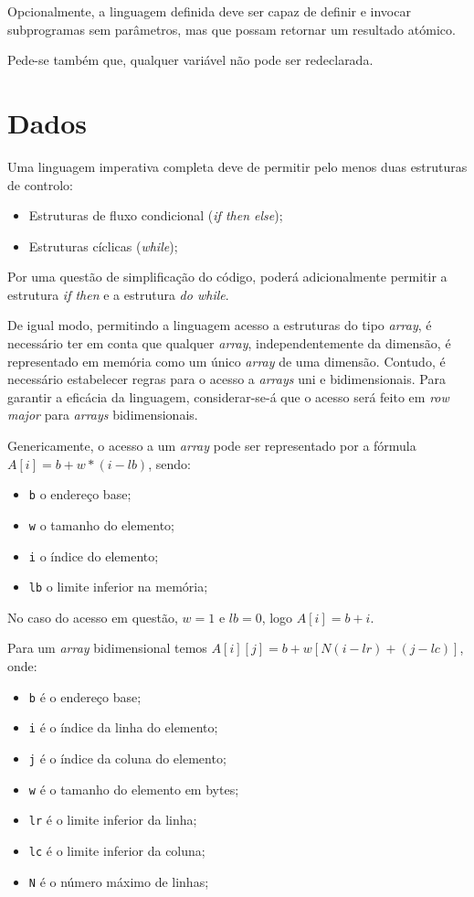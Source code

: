 Opcionalmente, a linguagem definida deve ser capaz de definir e invocar
subprogramas sem parâmetros, mas que possam retornar um resultado atómico.

Pede-se também que, qualquer variável não pode ser redeclarada.

\section{Dados}
\label{sec:dados:analise}

Uma linguagem imperativa completa deve de permitir pelo menos duas estruturas de controlo:

\begin{itemize}
	\item Estruturas de fluxo condicional (\emph{if then else});
	\item Estruturas cíclicas (\emph{while});
\end{itemize}

Por uma questão de simplificação do código, poderá adicionalmente permitir
a estrutura \emph{if then} e a estrutura \emph{do while}.

De igual modo, permitindo a linguagem acesso a estruturas do tipo \emph{array},
é necessário ter em conta que qualquer \emph{array}, independentemente da dimensão,
é representado em memória como um único \emph{array} de uma dimensão. Contudo,
é necessário estabelecer regras para o acesso a \emph{\emph{array}s} uni e bidimensionais. Para
garantir a eficácia da linguagem, considerar-se-á que o acesso será feito em
\emph{row major} para \emph{\emph{array}s} bidimensionais.

Genericamente, o acesso a um \emph{array} pode ser representado por a fórmula $A[i]
= b + w * (i - lb)$, sendo:

\begin{itemize}
	\item \texttt{b} o endereço base;
\item \texttt{w} o tamanho do elemento;
\item \texttt{i} o índice do elemento;
\item \texttt{lb} o limite inferior na memória;
\end{itemize}

No caso do acesso em questão, $w = 1$ e $lb = 0$, logo $A[i] = b + i$.

Para um \emph{array} bidimensional temos $A[i][j] = b + w [N(i - lr) + (j
- lc)]$, onde:

\begin{itemize}
	\item \texttt{b} é o endereço base;
\item \texttt{i} é o índice da linha do elemento;
\item \texttt{j} é o índice da coluna do elemento;
\item \texttt{w} é o tamanho do elemento em bytes;
\item \texttt{lr} é o limite inferior da linha;
\item \texttt{lc} é o limite inferior da coluna;
\item \texttt{N} é o número máximo de linhas;
\end{itemize}

